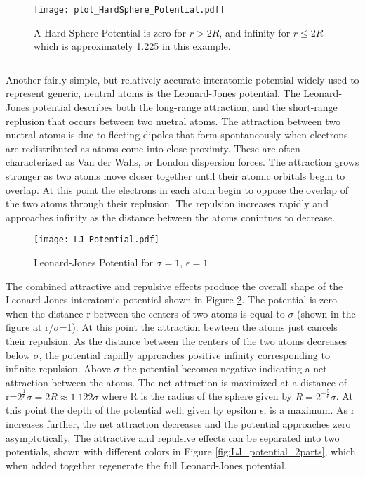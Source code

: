 \documentclass[12pt]{article}
\begin{document}
\begin{figure}[h!]
    \centering
    \texttt{[image: plot\_HardSphere\_Potential.pdf]}
    \caption{A Hard Sphere Potential is zero for $r>2R$, and infinity for $r\leq{2R}$ which is approximately 1.225 in this example.}
    \label{fig:HardSphere_potential}
  \end{figure}
\[{}\]
\[{}\]
\[{}\]
\[{}\]

Another fairly simple, but relatively accurate interatomic potential widely used to represent generic, neutral atoms is the Leonard-Jones potential. The Leonard-Jones potential describes both the long-range attraction, and the short-range replusion that occurs between two nuetral atoms. The attraction between two nuetral atoms is due to fleeting dipoles that form spontaneously when electrons are redistributed as atoms come into close proximty. These are often characterized as Van der Walls, or London dispersion forces. The attraction grows stronger as two atoms move closer together until their atomic orbitals begin to overlap. %
 At this point the electrons in each atom begin to oppose the overlap of the two atoms through their replusion. The repulsion increases rapidly and approaches infinity as the distance between the atoms conintues to decrease.  
 
\begin{figure}[h!]
    \centering
    \texttt{[image: LJ\_Potential.pdf]}
    \caption{Leonard-Jones Potential for $\sigma=1$, $\epsilon=1$}
    \label{fig:LJ_potential}
  \end{figure}

The combined attractive and repulsive effects produce the overall shape of the Leonard-Jones interatomic potential shown in Figure \ref{fig:LJ_potential}. The potential is zero when the distance r between the centers of two atoms is equal to $\sigma$ (shown in the figure at r/$\sigma$=1). At this point the attraction bewteen the atoms just cancels their repulsion. As the distance between the centers of the two atoms decreases below $\sigma$, the potential rapidly approaches positive infinity corresponding to infinite repulsion. Above $\sigma$ the potential becomes negative indicating a net attraction between the atoms. The net attraction is maximized at a distance of r=$2^\frac{1}{6}\sigma=2R\approx{1.122}\sigma$ where R is the radius of the sphere given by $R={2^{-\frac{5}{6}}}\sigma$. At this point the depth of the potential well, given by epsilon $\epsilon$, is a maximum. As r increases further, the net attraction decreases and the potential approaches zero asymptotically. The attractive and repulsive effects can be separated into two potentials, shown with different colors in Figure \ref{fig:LJ_potential_2parts}, which when added together regenerate the full Leonard-Jones potential. 
\end{document}
